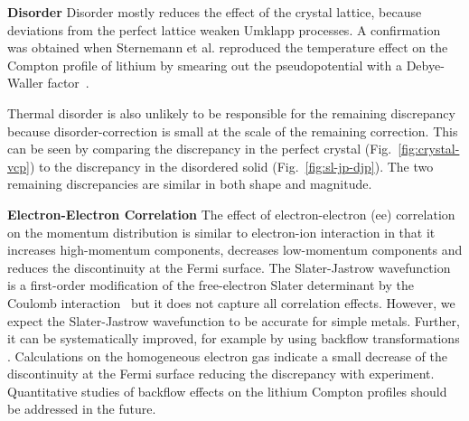 \documentclass[aps,prb,showpacs,preprintnumbers,amsmath,amssymb,superscriptaddress,twocolumn]{revtex4-1}
\begin{document}
{\bf Disorder}  Disorder mostly reduces the effect of the crystal lattice, because deviations from the perfect lattice weaken Umklapp processes. A confirmation was obtained when Sternemann et al. reproduced the temperature effect on the Compton profile of lithium by smearing out the pseudopotential with a Debye-Waller factor~\cite{Sternemann2001}.

Thermal disorder is also unlikely to be responsible for the remaining discrepancy because disorder-correction is small at the scale of the remaining correction. This can be seen by comparing the discrepancy in the perfect crystal (Fig.~\ref{fig:crystal-vcp}) to the discrepancy in the disordered solid (Fig.~\ref{fig:sl-jp-djp}). The two remaining discrepancies are similar in both shape and magnitude.


{\bf Electron-Electron Correlation}  The effect of electron-electron (ee) correlation on the momentum distribution is similar to electron-ion interaction in that it increases high-momentum components, decreases low-momentum components and reduces the discontinuity at the Fermi surface. %
The Slater-Jastrow wavefunction is a first-order modification of the free-electron Slater determinant by the Coulomb interaction~\cite{Holzmann2003} %
but it does not capture all correlation effects.
However, we expect the Slater-Jastrow wavefunction to be accurate for simple metals. 
Further, it can be systematically improved, for example by using backflow transformations \cite{PhysRevB.91.115106}. 
Calculations on the homogeneous electron gas indicate a small decrease of the discontinuity
at the Fermi 
surface \cite{Holzmann2011} reducing the discrepancy with experiment. Quantitative studies of
backflow effects on the lithium Compton profiles should be addressed in the future.
\end{document}

